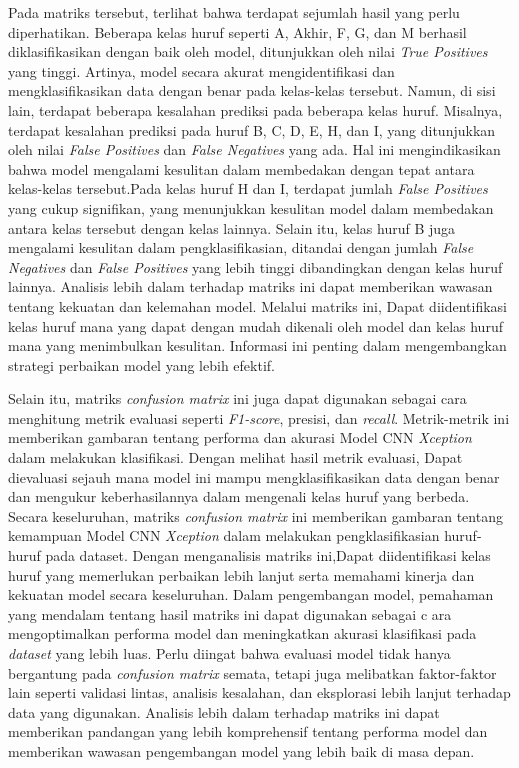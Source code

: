 Pada matriks tersebut, terlihat bahwa terdapat sejumlah hasil yang perlu diperhatikan. Beberapa kelas huruf seperti A, Akhir, F, G, dan M berhasil diklasifikasikan dengan baik oleh model, ditunjukkan oleh nilai \textit{True Positives} yang tinggi. Artinya, model secara akurat mengidentifikasi dan mengklasifikasikan data dengan benar pada kelas-kelas tersebut. Namun, di sisi lain, terdapat beberapa kesalahan prediksi pada beberapa kelas huruf. Misalnya, terdapat kesalahan prediksi pada huruf B, C, D, E, H, dan I, yang ditunjukkan oleh nilai \textit{False Positives} dan \textit{False Negatives} yang ada. Hal ini mengindikasikan bahwa model mengalami kesulitan dalam membedakan dengan tepat antara kelas-kelas tersebut.Pada kelas huruf H dan I, terdapat jumlah \textit{False Positives} yang cukup signifikan, yang menunjukkan kesulitan model dalam membedakan antara kelas tersebut dengan kelas lainnya. Selain itu, kelas huruf B juga mengalami kesulitan dalam pengklasifikasian, ditandai dengan jumlah \textit{False Negatives} dan \textit{False Positives} yang lebih tinggi dibandingkan dengan kelas huruf lainnya. Analisis lebih dalam terhadap matriks ini dapat memberikan wawasan tentang kekuatan dan kelemahan model. Melalui matriks ini, Dapat diidentifikasi kelas huruf mana yang dapat dengan mudah dikenali oleh model dan kelas huruf mana yang menimbulkan kesulitan. Informasi ini penting dalam mengembangkan strategi perbaikan model yang lebih efektif.

Selain itu, matriks \textit{confusion matrix} ini juga dapat digunakan sebagai cara menghitung metrik evaluasi seperti \textit{F1-score}, presisi, dan \textit{recall}. Metrik-metrik ini memberikan gambaran tentang performa dan akurasi Model CNN \textit{Xception} dalam melakukan klasifikasi. Dengan melihat hasil metrik evaluasi, Dapat dievaluasi sejauh mana model ini mampu mengklasifikasikan data dengan benar dan mengukur keberhasilannya dalam mengenali kelas huruf yang berbeda. Secara keseluruhan, matriks \textit{confusion matrix} ini memberikan gambaran tentang kemampuan Model CNN \textit{Xception} dalam melakukan pengklasifikasian huruf-huruf pada dataset. Dengan menganalisis matriks ini,Dapat diidentifikasi kelas huruf yang memerlukan perbaikan lebih lanjut serta memahami kinerja dan kekuatan model secara keseluruhan. Dalam pengembangan model, pemahaman yang mendalam tentang hasil matriks ini dapat digunakan sebagai c ara mengoptimalkan performa model dan meningkatkan akurasi klasifikasi pada \textit{dataset} yang lebih luas. Perlu diingat bahwa evaluasi model tidak hanya bergantung pada \textit{confusion matrix} semata, tetapi juga melibatkan faktor-faktor lain seperti validasi lintas, analisis kesalahan, dan eksplorasi lebih lanjut terhadap data yang digunakan. Analisis lebih dalam terhadap matriks ini dapat memberikan pandangan yang lebih komprehensif tentang performa model dan memberikan wawasan pengembangan model yang lebih baik di masa depan.

